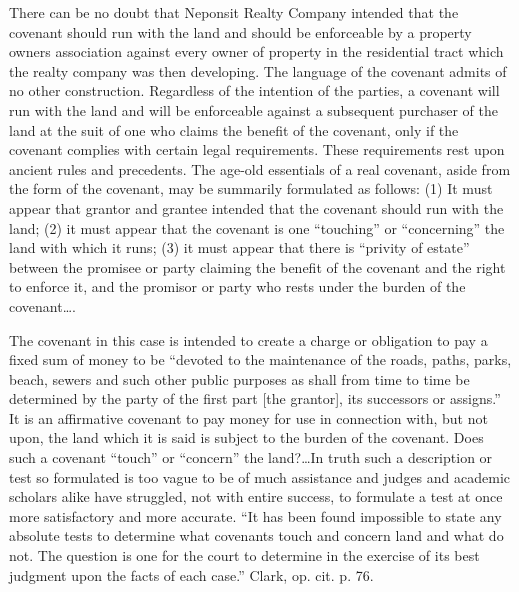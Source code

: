 There can be no doubt that Neponsit Realty Company intended that the covenant
should run with the land and should be enforceable by a property owners
association against every owner of property in the residential tract which the
realty company was then developing. The language of the covenant admits of no
other construction. Regardless of the intention of the parties, a covenant will
run with the land and will be enforceable against a subsequent purchaser of the
land at the suit of one who claims the benefit of the covenant, only if the
covenant complies with certain legal requirements. These requirements rest upon
ancient rules and precedents. The age-old essentials of a real covenant, aside
from the form of the covenant, may be summarily formulated as follows: (1) It
must appear that grantor and grantee intended that the covenant should run with
the land; (2) it must appear that the covenant is one ``touching'' or
``concerning'' the land with which it runs; (3) it must appear that there is
``privity of estate'' between the promisee or party claiming the benefit of the
covenant and the right to enforce it, and the promisor or party who rests under
the burden of the covenant\ldots .

The covenant in this case is intended to create a charge or obligation to pay a
fixed sum of money to be ``devoted to the maintenance of the roads, paths, parks,
beach, sewers and such other public purposes as shall from time to time be
determined by the party of the first part [the grantor], its successors or
assigns.'' It is an affirmative covenant to pay money for use in connection with,
but not upon, the land which it is said is subject to the burden of the
covenant. Does such a covenant ``touch'' or ``concern'' the land?\ldots In truth
such a description or test so formulated is too vague to be of much assistance
and judges and academic scholars alike have struggled, not with entire success,
to formulate a test at once more satisfactory and more accurate. ``It has been
found impossible to state any absolute tests to determine what covenants touch
and concern land and what do not. The question is one for the court to determine
in the exercise of its best judgment upon the facts of each case.'' Clark, op.
cit. p. 76.

